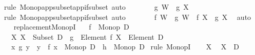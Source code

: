 \begin{isabellebody}
\ {\isacharparenleft}{\kern0pt}rule\ Monop{\isacharunderscore}{\kern0pt}app{\isacharunderscore}{\kern0pt}subset{\isacharunderscore}{\kern0pt}app{\isacharunderscore}{\kern0pt}if{\isacharunderscore}{\kern0pt}subset{\isacharparenright}{\kern0pt}\ auto\isanewline
\ \ \ \ \isamarkupfalse%
\ \isamarkupfalse%
\ {\isachardoublequoteopen}g\ W\ {\isasymsubseteq}\ g\ X{\isachardoublequoteclose}\ \isamarkupfalse%
\ {\isacharparenleft}{\kern0pt}rule\ Monop{\isacharunderscore}{\kern0pt}app{\isacharunderscore}{\kern0pt}subset{\isacharunderscore}{\kern0pt}app{\isacharunderscore}{\kern0pt}if{\isacharunderscore}{\kern0pt}subset{\isacharparenright}{\kern0pt}\ auto\isanewline
\ \ \ \ \isamarkupfalse%
\ \isamarkupfalse%
\ {\isachardoublequoteopen}f\ W\ {\isasymunion}\ g\ W\ {\isasymsubseteq}\ f\ X\ {\isasymunion}\ g\ X{\isachardoublequoteclose}\ \isamarkupfalse%
\ auto\isanewline
\ \ \isamarkupfalse%
\isanewline
{}\isamarkupfalse%
%
\endisatagproof
{\isafoldproof}%
%
\isadelimproof
\isanewline
%
\endisadelimproof
\isanewline
{}\isamarkupfalse%
\ replacement{\isacharunderscore}{\kern0pt}MonopI{\isacharcolon}{\kern0pt}\isanewline
\ \ \ {\isachardoublequoteopen}f\ {\isacharcolon}{\kern0pt}\ Monop\ D{\isachardoublequoteclose}\isanewline
\ \ \ {\isachardoublequoteopen}{\isasymAnd}X{\isachardot}{\kern0pt}\ X\ {\isacharcolon}{\kern0pt}\ Subset\ D\ {\isasymLongrightarrow}\ g\ {\isacharcolon}{\kern0pt}\ Element\ {\isacharparenleft}{\kern0pt}f\ X{\isacharparenright}{\kern0pt}\ {\isasymRightarrow}\ Element\ D{\isachardoublequoteclose}\isanewline
\ \ \ {\isachardoublequoteopen}{\isacharparenleft}{\kern0pt}{\isasymlambda}x{\isachardot}{\kern0pt}\ {\isacharbraceleft}{\kern0pt}g\ y\ {\isacharbar}{\kern0pt}\ y\ {\isasymin}\ f\ x{\isacharbraceright}{\kern0pt}{\isacharparenright}{\kern0pt}\ {\isacharcolon}{\kern0pt}\ Monop\ D{\isachardoublequoteclose}\ {\isacharparenleft}{\kern0pt}\ {\isachardoublequoteopen}{\isacharquery}{\kern0pt}h\ {\isacharcolon}{\kern0pt}\ Monop\ D{\isachardoublequoteclose}{\isacharparenright}{\kern0pt}\isanewline
%
\isadelimproof
%
\endisadelimproof
%
\isatagproof
{}\isamarkupfalse%
\ {\isacharparenleft}{\kern0pt}rule\ MonopI{\isacharparenright}{\kern0pt}\isanewline
\ \ \isamarkupfalse%
\ X\ \isamarkupfalse%
\ {\isachardoublequoteopen}X\ {\isasymsubseteq}\ D{\isachardoublequoteclose}\isanewline
\ \ \isamarkupfalse%

\end{isabellebody}
